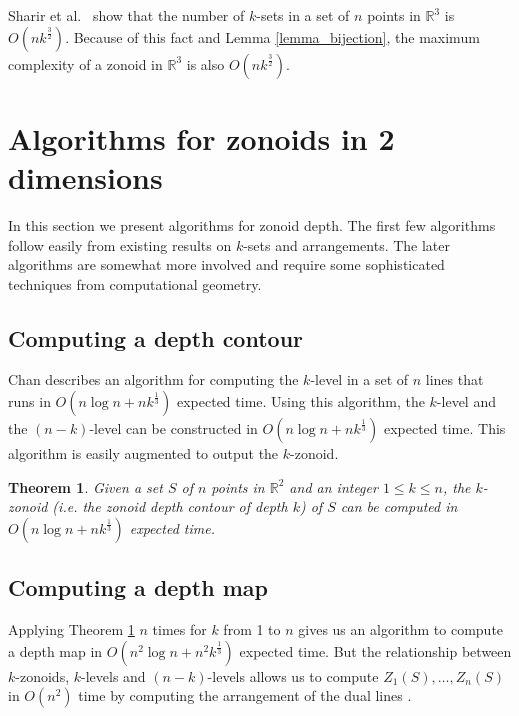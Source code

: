 \documentclass[charterfonts,lotsofwhite]{patmorin}
\newtheorem{theorem}{Theorem}
\begin{document}
Sharir et al.\ \cite{an_improved_bound_for_ksets_in_three_dimensions}
show that the number of $k$-sets in a set of $n$ points in
$\mathbb{R}^3$ is $O(nk^{\frac{3}{2}})$. Because of this fact and
Lemma \ref{lemma_bijection}, the maximum complexity of a zonoid in
$\mathbb{R}^3$ is also $O(nk^{\frac{3}{2}})$.

\section{Algorithms for zonoids in 2 dimensions}\label{section_algorithms_for_zonoids_in_2_dimensions}

In this section we present algorithms for zonoid depth. The first few
algorithms follow easily from existing results on $k$-sets and
arrangements. The later algorithms are somewhat more involved and
require some sophisticated techniques from computational geometry.

\subsection{Computing a depth contour}\label{subsection_computing_a_depth_countour}

Chan \cite{remarks_on_klevel_algorithms_in_the_plane} describes an
algorithm for computing the $k$-level in a set of $n$ lines that runs
in $O(n \log n + nk^{\frac{1}{3}})$ expected time. Using this
algorithm, the $k$-level and the $(n-k)$-level can be constructed in
$O(n \log n + nk^{\frac{1}{3}})$ expected time. This algorithm is
easily augmented to output the $k$-zonoid. 

\begin{theorem}\label{theorem_build_k_zonoid}
Given a set $S$ of $n$ points in $\mathbb{R}^2$ and an integer $1 \le k \le n$, the $k$-zonoid (i.e. the zonoid depth contour of depth $k$) of $S$ can be computed in $O(n \log n + nk^{\frac{1}{3}})$ expected time.
\end{theorem}

\subsection{Computing a depth map}\label{subsection_computing_a_depth_map}

Applying Theorem \ref{theorem_build_k_zonoid} $n$ times for $k$ from 1
to $n$ gives us an algorithm to compute a depth map in $O(n^2 \log n +
n^2 k^{\frac{1}{3}})$ expected time. But the relationship between
$k$-zonoids, $k$-levels and $(n-k)$-levels allows us to compute
$Z_1(S),\ldots,Z_n(S)$ in $O(n^2)$ time by computing the arrangement
of the dual lines \cite{edelsbrunner_book}.
\end{document}
